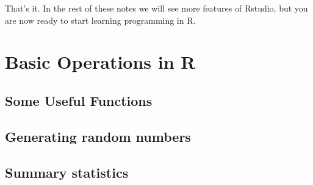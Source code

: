 That's it. In the rest of these notes we will see more features of Rstudio, but you are now ready to start learning programming in R.


\section{Basic Operations in R}
\subsection{Some Useful Functions}


\subsection{Generating random numbers}



\subsection{Summary statistics}

